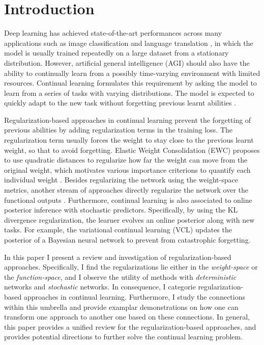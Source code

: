 \section{Introduction}

Deep learning has achieved state-of-the-art performances across many applications such as image classification \citep{he2016deep} and language translation \citep{wu2016google}, in which the model is usually trained repeatedly on a large dataset from a stationary distribution. However, artificial general intelligence (AGI) should also have the ability to continually learn from a possibly time-varying environment with limited resources. Continual learning \citep{kirkpatrick2017overcoming} formulates this requirement by asking the model to learn from a series of tasks with varying distributions. The model is expected to quickly adapt to the new task without forgetting previous learnt abilities \citep{french1999catastrophic} .  

Regularization-based approaches in continual learning prevent the forgetting of previous abilities by adding regularization terms in the training loss. The regularization term usually forces the weight to stay close to the previous learnt weight, so that to avoid forgetting. Elastic Weight Consolidation (EWC) \citep{kirkpatrick2017overcoming} proposes to use quadratic distances to regularize how far the weight can move from the original weight, which motivates various importance criterions to quantify each individual weight \citep{zenke2017continual, aljundi2018memory, ritter2018online}. 
Besides regularizing the network using the weight-space metrics, another stream of approaches directly regularize the network over the functional outputs \citep{benjamin2018measuring, buzzega2020dark, rebuffi2017icarl}. Furthermore, continual learning is also associated to online posterior inference with stochastic predictors. Specifically, by using the KL divergence regularization, the learner evolves an online posterior along with new tasks.    For example, the variational continual learning (VCL) \citep{nguyen2017variational} updates the posterior of a Bayesian neural network to prevent from catastrophic forgetting.


In this paper I present a review and investigation of regularization-based approaches. Specifically, I find the regularizations lie either in the \emph{weight-space} or the \emph{function-space}, and I observe the utility of methods with \emph{deterministic} networks and \emph{stochastic} networks. In consequence, I categorie regularization-based approaches in continual learning. Furthermore, I study the connections within this umbrella and provide examplar demonstrations on how one can transform one approach to another one based on these connections. 
In general, this paper provides a unified review for the regularization-based approaches, and provides potential directions to further solve the continual learning problem.